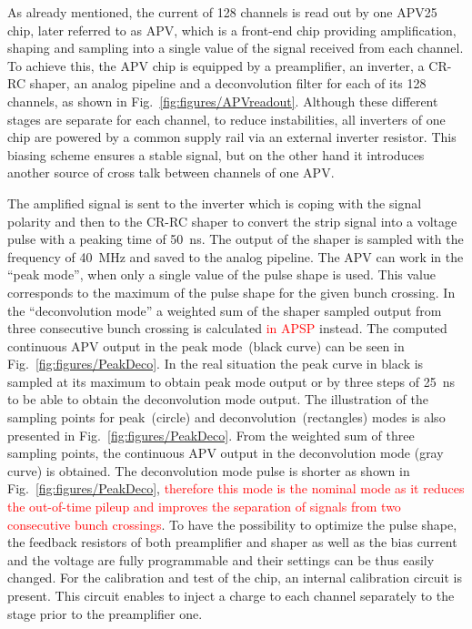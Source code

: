 As already mentioned, the current of 128 channels is read out by one APV25~\cite{French:2001xb} chip, later referred to as APV, which is a front-end chip providing amplification, shaping and sampling into a single value of the signal received from each channel. To achieve this, the APV chip is equipped by a preamplifier, an inverter, a CR-RC shaper, an analog pipeline and a deconvolution filter for each of its 128 channels, as shown in Fig.~\ref{fig:figures/APVreadout}. Although these different stages are separate for each channel, to reduce instabilities, all inverters of one chip are powered by a common supply rail via an external inverter resistor. This biasing scheme ensures a stable signal, but on the other hand it introduces another source of cross talk between channels of one APV.

The amplified signal is sent to the inverter which is coping with the signal polarity and then to the CR-RC shaper to convert the strip signal into a voltage pulse with a peaking time of 50~ns. The output of the shaper is sampled with the frequency of 40~MHz and saved to the analog pipeline. The APV can work in the ``peak mode'', when only a single value of the pulse shape is used. This value corresponds to the maximum of the pulse shape for the given bunch crossing. In the ``deconvolution mode'' a weighted sum of the shaper sampled output from three consecutive bunch crossing is calculated \textcolor{red}{in APSP} instead. The computed continuous APV output in the peak mode~(black curve) can be seen in Fig.~\ref{fig:figures/PeakDeco}. In the real situation the peak curve in black is sampled at its maximum to obtain peak mode output or by three steps of 25~ns to be able to obtain the deconvolution mode output. The illustration of the sampling points for peak~(circle) and deconvolution~(rectangles) modes is also presented in Fig.~\ref{fig:figures/PeakDeco}. From the weighted sum of three sampling points, the continuous APV output in the deconvolution mode (gray curve) is obtained. The deconvolution mode pulse is shorter as shown in Fig.~\ref{fig:figures/PeakDeco}, \textcolor{red}{ therefore this mode is the nominal mode as it reduces the out-of-time pileup and improves the separation of signals from two consecutive bunch crossings}. To have the possibility to optimize the pulse shape, the feedback resistors of both preamplifier and shaper as well as the bias current and the voltage are fully programmable and their settings can be thus easily changed. For the calibration and test of the chip, an internal calibration circuit is present. This circuit enables to inject a charge to each channel separately to the stage prior to the preamplifier one.


